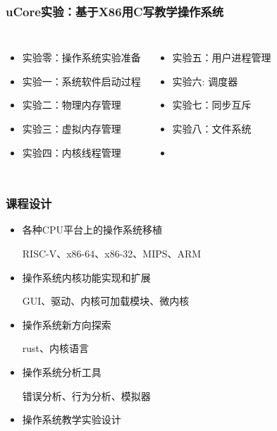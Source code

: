\documentclass[UTF8]{ctexbeamer}
\begin{document}
\begin{frame}
\frametitle{uCore实验：基于X86用C写教学操作系统}
\begin{columns}
\begin{itemize}
		\item 实验零：操作系统实验准备
		\item 实验一：系统软件启动过程
		\item 实验二：物理内存管理
		\item 实验三：虚拟内存管理
		\item 实验四：内核线程管理
\end{itemize}
 
    \begin{itemize}
		\item 实验五：用户进程管理
		\item 实验六: 调度器
		\item 实验七：同步互斥
		\item 实验八：文件系统
		\item 
	\end{itemize}
\end{columns}

\end{frame}

   \begin{frame}
        \frametitle{课程设计}
        \begin{itemize}
        \item 各种CPU平台上的操作系统移植
        
        \subitem RISC-V、x86-64、x86-32、MIPS、ARM
        \item 操作系统内核功能实现和扩展
        
        \subitem GUI、驱动、内核可加载模块、微内核
        \item 操作系统新方向探索
        
        \subitem rust、内核语言
        \item 操作系统分析工具
        
        \subitem 错误分析、行为分析、模拟器
        \item 操作系统教学实验设计
        \end{itemize}
    \end{frame}
    
\end{document}
